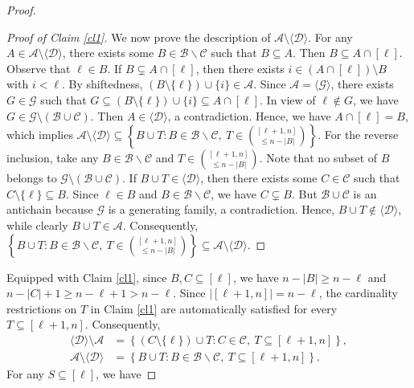 \documentclass[11pt]{article}
\begin{document}
\begin{proof}
\begin{proof}[Proof of Claim \ref{cl1}]
We now prove the  description of $\mathcal{A}\setminus\langle\mathcal{D}\rangle$.
For any $A\in\mathcal{A}\setminus\langle\mathcal{D}\rangle$, there exists some $B\in\mathcal{B}\backslash \mathcal{C}$ such that $B\subseteq A$. Then $B\subseteq A\cap[\ell]$.
Observe that $\ell\in B$. 
If $B\subsetneq A\cap[\ell]$, then there exists $i\in(A\cap[\ell])\setminus B$ with $i<\ell$.
By shiftedness, $(B\setminus\{\ell\})\cup\{i\}\in\mathcal{A}$. Since 
$\mathcal{A}= \langle\mathcal{G}\rangle$, there exists $G\in\mathcal{G}$ such that $G\subseteq(B\setminus\{\ell\})\cup\{i\}\subseteq A\cap[\ell]$.
In view of $\ell \notin G$, we have $G\in\mathcal{G}\setminus(\mathcal{B}\cup\mathcal{C})$.
Then $A\in\langle\mathcal{D}\rangle$, a contradiction. Hence, we have $A\cap[\ell]=B$, which implies 
$\mathcal{A}\setminus\langle\mathcal{D}\rangle\subseteq\left\{B\cup T: B\in\mathcal{B}\backslash \mathcal{C},\ T\in\binom{[\ell+1,n]}{\leq n-|B|}\right\}$.
For the reverse inclusion, take any  $B\in\mathcal{B}\backslash \mathcal{C}$ and $ T\in\binom{[\ell+1,n]}{\leq n-|B|}$. Note that no subset of $B$ belongs to $\mathcal{G}\setminus(\mathcal{B}\cup  \mathcal{C})$.
If  $B\cup T \in \langle\mathcal{D}\rangle$, then there exists some  
$C\in\mathcal{C}$ such that $C\setminus\{\ell\}\subseteq B$.
Since $\ell\in B$ and $B\in\mathcal{B}\backslash \mathcal{C}$, we  have $C\subsetneq B$. 
But $\mathcal{B}\cup\mathcal{C}$ is an antichain because $\mathcal{G}$ is a  generating family, a contradiction.
Hence, $B\cup T \notin \langle\mathcal{D}\rangle$, while clearly $B\cup T \in \mathcal{A}$. Consequently,
$\left\{B\cup T: B\in\mathcal{B}\backslash \mathcal{C},\ T\in\binom{[\ell+1,n]}{\leq n-|B|}\right\}\subseteq\mathcal{A}\setminus\langle\mathcal{D}\rangle$.
\end{proof}
Equipped with Claim \ref{cl1}, since $B, C \subseteq [\ell]$, we have   $n-|B| \ge n-\ell$ and $n-|C|+1 \ge n-\ell+1 > n-\ell$. Since $|[\ell+1,n]| = n-\ell$, the cardinality restrictions on $T$ in Claim \ref{cl1} are automatically satisfied for every $T \subseteq [\ell+1,n]$. Consequently, 
\begin{align}
\langle \mathcal{D} \rangle \setminus \mathcal{A} 
&= 
\left\{ (C \setminus \{\ell\}) \cup T : C \in \mathcal{C},\ T \subseteq [\ell+1,n] \right\}, \label{f1} \\
\mathcal{A} \setminus \langle \mathcal{D} \rangle 
&= 
\left\{ B \cup T : B \in \mathcal{B}\backslash \mathcal{C},\ T \subseteq [\ell+1,n] \right\}. \label{f2}
\end{align}
For any $S \subseteq [\ell]$, we have

\end{proof}
\end{document}
